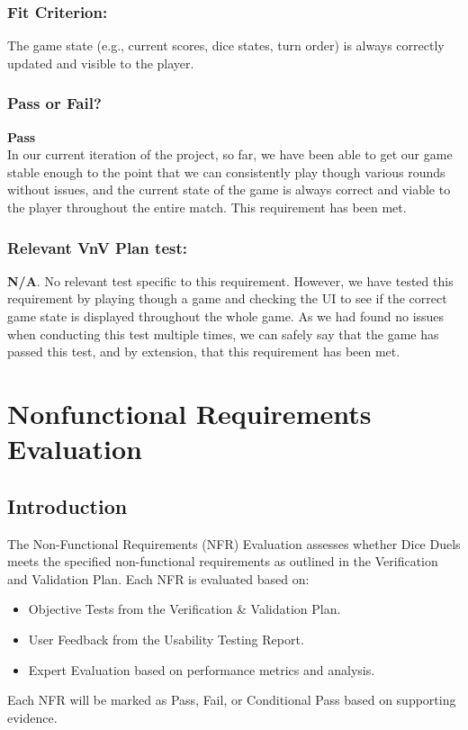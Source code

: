 \documentclass[12pt, titlepage]{article}
\begin{document}
\subsubsection{Fit Criterion:}The game state (e.g., current scores, dice states, turn order) is always correctly updated and visible to the player.

\subsubsection{Pass or Fail?} 

 \noindent \textbf{Pass}\\
 
 \noindent In our current iteration of the project, so far, we have been able to get our game stable enough to the point that we can consistently play though various rounds without issues, and the current state of the game is always correct and viable to the player throughout the entire match. This requirement has been met.
 
 \subsubsection{Relevant VnV Plan test: } \textbf{N/A}. No relevant test specific to this requirement. However, we have tested this requirement by  playing though a game and checking the UI to see if the correct game state is displayed throughout the whole game. As we had found no issues when conducting this test multiple times, we can safely say that the game has passed this test, and by extension, that this requirement has been met.


\section{Nonfunctional Requirements Evaluation}

\subsection{Introduction}

The Non-Functional Requirements (NFR) Evaluation assesses whether Dice Duels meets the specified non-functional requirements as outlined in the Verification and Validation Plan. Each NFR is evaluated based on:
\begin{itemize}
	\item Objective Tests from the Verification \& Validation Plan.
	\item User Feedback from the Usability Testing Report.
	\item Expert Evaluation based on performance metrics and analysis.
\end{itemize}
Each NFR will be marked as Pass, Fail, or Conditional Pass based on supporting evidence.
\end{document}
